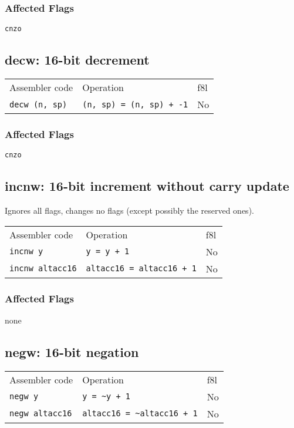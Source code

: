 \documentclass{book}
\begin{document}
\subsubsection*{Affected Flags}

\texttt{cnzo}


\subsection{decw: 16-bit decrement}

\begin{tabular}{l l l}
Assembler code        & Operation                       & f8l \\
\texttt{decw (n, sp)} & \texttt{(n, sp) = (n, sp) + -1} & No \\
\end{tabular}

\subsubsection*{Affected Flags}

\texttt{cnzo}


\subsection{incnw: 16-bit increment without carry update}

Ignores all flags, changes no flags (except possibly the reserved ones).

\begin{tabular}{l l l}
Assembler code          & Operation                        & f8l \\
\texttt{incnw y}        & \texttt{y = y + 1}               & No \\
\texttt{incnw altacc16} & \texttt{altacc16 = altacc16 + 1} & No \\
\end{tabular}

\subsubsection*{Affected Flags}

none


\subsection{negw: 16-bit negation}

\begin{tabular}{l l l}
Assembler code         & Operation                            & f8l \\
\texttt{negw y}        & \texttt{y = \~{}y + 1}               & No \\
\texttt{negw altacc16} & \texttt{altacc16 = \~{}altacc16 + 1} & No \\
\end{tabular}
\end{document}
